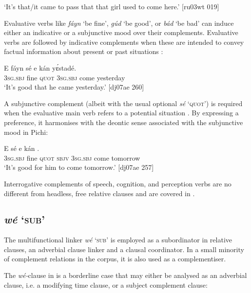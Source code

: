 \glt ‘It’s that/it came to pass that that girl used to come here.’ [ru03wt 019]
\z

Evaluative verbs like \textit{fáyn} ‘be fine’, \textit{gúd} ‘be good’, or \textit{bád} ‘be bad’ can induce either an indicative or a subjunctive mood over their complements. Evaluative verbs are followed by indicative complements when these are intended to convey factual information about present or past situations : 


\ea%
    \label{ex:key:1410}
    \gll E    fáyn  sé    e    kán    yɛ́stadé.\\
\textsc{3sg.sbj}  fine    \textsc{quot}    \textsc{3sg.sbj}  come  yesterday\\

\glt ‘It’s good that he came yesterday.’ [dj07ae 260]
\z

A subjunctive complement (albeit with the usual optional \textit{sé} ‘\textsc{quot}’) is required when the evaluative main verb refers to a potential situation . By expressing a preference, it harmonises with the deontic sense associated with the subjunctive mood in Pichi:


\ea%
    \label{ex:key:1411}
    \gll E      sé       e    kán    .\\
\textsc{3sg.sbj}  fine    \textsc{quot}    \textsc{sbjv}    \textsc{3sg.sbj}  come  tomorrow\\

\glt ‘It’s good for him to come tomorrow.’ [dj07ae 257]
\z

Interrogative complements of speech, cognition, and perception verbs are no different from headless, free relative clauses and are covered in . 

\subsection{\textit{wé} ‘\textsc{sub}’}

The multifunctional linker \textit{wé} ‘\textsc{sub’} is employed as a subordinator in relative clauses, an adverbial clause linker and a clausal coordinator. In a small minority of complement relations in the corpus, it is also used as a complementiser. 


The \textit{wé-}clause in  is a borderline case that may either be analysed as an adverbial clause, i.e. a modifying time clause, or a subject complement clause:



